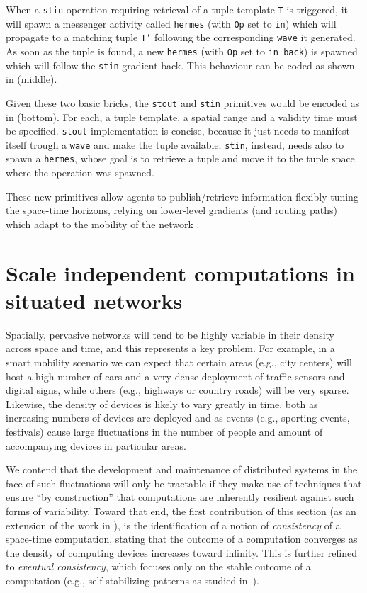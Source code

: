 \documentclass[12pt,a4paper,twoside,openright]{book}
\begin{document}
When a \texttt{stin} operation requiring retrieval of a tuple template \texttt{T} is triggered, it will spawn a messenger activity called \texttt{hermes} (with \texttt{Op} set to \texttt{in}) which will propagate to a matching tuple \texttt{T'} following the corresponding \texttt{wave} it generated. As soon as the tuple is found, a new \texttt{hermes} (with \texttt{Op} set to \texttt{in\_back}) is spawned which will follow the \texttt{stin} gradient back. This behaviour can be coded as shown in  (middle). 

Given these two basic bricks, the \texttt{stout} and \texttt{stin} primitives would be encoded as in  (bottom). For each, a tuple template, a spatial range and a validity time must be specified. \texttt{stout} implementation is concise, because it just needs to manifest itself trough a \texttt{wave} and make the tuple available; \texttt{stin}, instead, needs also to spawn a \texttt{hermes}, whose goal is to retrieve a tuple and move it to the tuple space where the operation was spawned.

These new primitives allow agents to publish/retrieve information flexibly tuning the space-time horizons, relying on lower-level gradients (and routing paths) which adapt to the mobility of the network \cite{flexiblegradients}.

\section{Scale independent computations in situated networks}

Spatially, pervasive networks will tend to be highly variable in their density across space and time, and this represents a key problem.
%
For example, in a smart mobility scenario we can expect that certain areas (e.g., city centers) will host a high number of cars and a very dense deployment of traffic sensors and digital signs, while others (e.g., highways or country roads) will be very sparse.
%
Likewise, the density of devices is likely to vary greatly in time, both as increasing numbers of devices are deployed and as events (e.g., sporting events, festivals) cause large fluctuations in the number of people and amount of accompanying devices in particular areas.

We contend that the development and maintenance of distributed systems in the face of such fluctuations will only be tractable if they make use of techniques that ensure ``by construction'' that computations are inherently resilient against such forms of variability.
%
Toward that end, the first contribution of this section (as an extension of the work in \cite{BVD-SCW14}), is the identification of a notion of \emph{consistency} of a space-time computation, stating that the outcome of a computation converges as the density of computing devices increases toward infinity.
%
This is further refined to \emph{eventual consistency}, which focuses only on the stable outcome of a computation (e.g., self-stabilizing patterns as studied in~\cite{VD-COORD2014-LNCS2014}).
\end{document}
